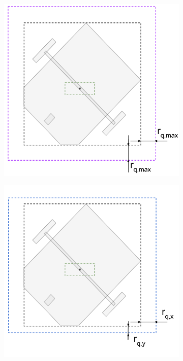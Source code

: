 \begin{figure}[htp]
    \centering
    \begin{subfigure}{0.4\textwidth}
        \centering
        \includegraphics[width=\linewidth]{figures/samp/CC1.png}
        \caption{}
        \label{fig:CC1}
    \end{subfigure}
    \begin{subfigure}{0.4\textwidth}
        \centering
        \includegraphics[width=\linewidth]{figures/samp/CC2.png}
        \caption{}
        \label{fig:CC2}
    \end{subfigure}
    

\end{figure}
